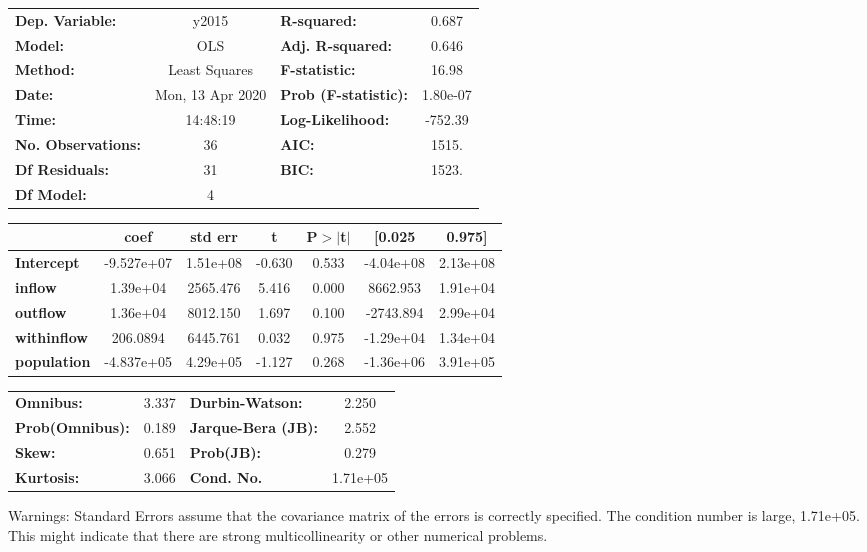 \begin{center}
\begin{tabular}{lclc}
\toprule
\textbf{Dep. Variable:}    &      y2015       & \textbf{  R-squared:         } &     0.687   \\
\textbf{Model:}            &       OLS        & \textbf{  Adj. R-squared:    } &     0.646   \\
\textbf{Method:}           &  Least Squares   & \textbf{  F-statistic:       } &     16.98   \\
\textbf{Date:}             & Mon, 13 Apr 2020 & \textbf{  Prob (F-statistic):} &  1.80e-07   \\
\textbf{Time:}             &     14:48:19     & \textbf{  Log-Likelihood:    } &   -752.39   \\
\textbf{No. Observations:} &          36      & \textbf{  AIC:               } &     1515.   \\
\textbf{Df Residuals:}     &          31      & \textbf{  BIC:               } &     1523.   \\
\textbf{Df Model:}         &           4      & \textbf{                     } &             \\
\bottomrule
\end{tabular}
\begin{tabular}{lcccccc}
                    & \textbf{coef} & \textbf{std err} & \textbf{t} & \textbf{P$> |$t$|$} & \textbf{[0.025} & \textbf{0.975]}  \\
\midrule
\textbf{Intercept}  &   -9.527e+07  &     1.51e+08     &    -0.630  &         0.533        &    -4.04e+08    &     2.13e+08     \\
\textbf{inflow}     &     1.39e+04  &     2565.476     &     5.416  &         0.000        &     8662.953    &     1.91e+04     \\
\textbf{outflow}    &     1.36e+04  &     8012.150     &     1.697  &         0.100        &    -2743.894    &     2.99e+04     \\
\textbf{withinflow} &     206.0894  &     6445.761     &     0.032  &         0.975        &    -1.29e+04    &     1.34e+04     \\
\textbf{population} &   -4.837e+05  &     4.29e+05     &    -1.127  &         0.268        &    -1.36e+06    &     3.91e+05     \\
\bottomrule
\end{tabular}
\begin{tabular}{lclc}
\textbf{Omnibus:}       &  3.337 & \textbf{  Durbin-Watson:     } &    2.250  \\
\textbf{Prob(Omnibus):} &  0.189 & \textbf{  Jarque-Bera (JB):  } &    2.552  \\
\textbf{Skew:}          &  0.651 & \textbf{  Prob(JB):          } &    0.279  \\
\textbf{Kurtosis:}      &  3.066 & \textbf{  Cond. No.          } & 1.71e+05  \\
\bottomrule
\end{tabular}
\end{center}

Warnings: \newline
 [1] Standard Errors assume that the covariance matrix of the errors is correctly specified. \newline
 [2] The condition number is large, 1.71e+05. This might indicate that there are \newline
 strong multicollinearity or other numerical problems.